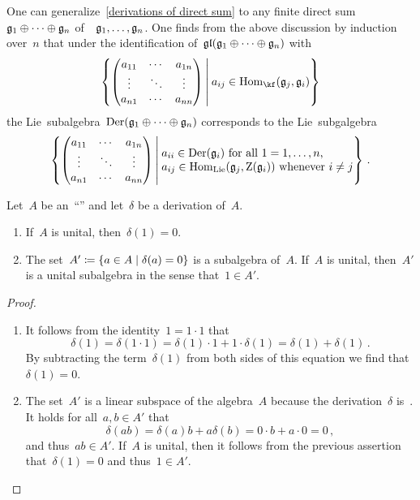 \begin{remark}
	One can generalize~\cref{derivations of direct sum} to any finite direct sum~$\mathfrak{g}_1 \oplus \dotsb \oplus \mathfrak{g}_n$ of~\liealgebras{$\kf$}~$\mathfrak{g}_1, \dotsc, \mathfrak{g}_n$.
	One finds from the above discussion by induction over~$n$ that under the identification of~$\mathfrak{gl}( \mathfrak{g}_1 \oplus \dotsb \oplus \mathfrak{g}_n )$ with
	\[
		\left\{
			\begin{pmatrix}
				a_{11}  & \cdots  & a_{1n}  \\
				\vdots  & \ddots  & \vdots  \\
				a_{n1}  & \cdots  & a_{nn}
			\end{pmatrix}
		\suchthat*
			a_{ij} \in \Hom_{\kf}( \glie_j, \glie_i )
		\right\}
	\]
	the Lie~subalgebra~$\operatorname{Der}(\mathfrak{g}_1 \oplus \dotsb \oplus \mathfrak{g}_n)$ corresponds to the Lie~subgalgebra
	\[
		\left\{
			\begin{pmatrix}
				a_{11}  & \cdots  & a_{1n}  \\
				\vdots  & \ddots  & \vdots  \\
				a_{n1}  & \cdots  & a_{nn}
			\end{pmatrix}
		\suchthat*
			\begin{tabular}{@{}l@{}}
				$a_{ii} \in \Der(\glie_i)$ for all~$1 = 1, \dotsc, n$, \\
				$a_{ij} \in \Hom_{\Lie}(\glie_j, \centerlie(\glie_i))$ whenever~$i \neq j$
			\end{tabular}
		\right\} \,.
	\]
\end{remark}


\begin{lemma}
	\label{about the kernel of a derivation}
	Let~$A$ be an~\enquote{\algebra{$\kf$}} and let~$\delta$ be a derivation of~$A$.
	\begin{enumerate}
		\item
			If~$A$ is unital, then~$\delta(1) = 0$.
		\item
			The set~$A' \defined \{ a \in A \suchthat \delta(a) = 0 \}$ is a subalgebra of~$A$.
			If~$A$ is unital, then~$A'$ is a unital subalgebra in the sense that~$1 \in A'$.
	\end{enumerate}
\end{lemma}


\begin{proof}
	\leavevmode
	\begin{enumerate}
		\item
			It follows from the identity~$1 = 1 \cdot 1$ that
			\[
				\delta(1)
				=
				\delta(1 \cdot 1)
				=
				\delta(1) \cdot 1 + 1 \cdot \delta(1)
				=
				\delta(1) + \delta(1) \,.
			\]
			By subtracting the term~$\delta(1)$ from both sides of this equation we find that~$\delta(1) = 0$.
		\item
			The set~$A'$ is a linear subspace of the algebra~$A$ because the derivation~$\delta$ is~\linear{$\kf$}.
			It holds for all~$a, b \in A'$ that
			\[
				\delta(ab)
				=
				\delta(a) b + a \delta(b)
				=
				0 \cdot b + a \cdot 0
				=
				0 \,,
			\]
			and thus~$ab \in A'$.
			If~$A$ is unital, then it follows from the previous assertion that~$\delta(1) = 0$ and thus~$1 \in A'$.
		\qedhere
	\end{enumerate}
\end{proof}


